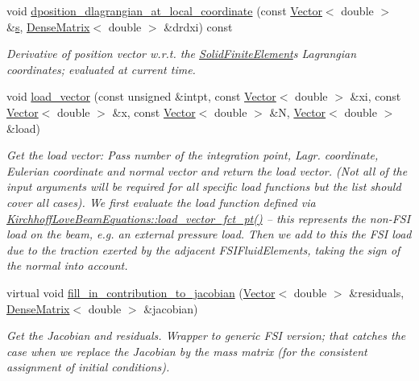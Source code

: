 \begin{DoxyCompactItemize}
void \hyperlink{classoomph_1_1FSIHermiteBeamElement_a29b2c933785e8b83eaed01608bf2463b}{dposition\+\_\+dlagrangian\+\_\+at\+\_\+local\+\_\+coordinate} (const \hyperlink{classoomph_1_1Vector}{Vector}$<$ double $>$ \&\hyperlink{cfortran_8h_ab7123126e4885ef647dd9c6e3807a21c}{s}, \hyperlink{classoomph_1_1DenseMatrix}{Dense\+Matrix}$<$ double $>$ \&drdxi) const
\begin{DoxyCompactList}\small\item\em Derivative of position vector w.\+r.\+t. the \hyperlink{classoomph_1_1SolidFiniteElement}{Solid\+Finite\+Element}\textquotesingle{}s Lagrangian coordinates; evaluated at current time. \end{DoxyCompactList}\item 
void \hyperlink{classoomph_1_1FSIHermiteBeamElement_aee4b8fcdef1a2247389bab8807d5db8e}{load\+\_\+vector} (const unsigned \&intpt, const \hyperlink{classoomph_1_1Vector}{Vector}$<$ double $>$ \&xi, const \hyperlink{classoomph_1_1Vector}{Vector}$<$ double $>$ \&x, const \hyperlink{classoomph_1_1Vector}{Vector}$<$ double $>$ \&N, \hyperlink{classoomph_1_1Vector}{Vector}$<$ double $>$ \&load)
\begin{DoxyCompactList}\small\item\em Get the load vector\+: Pass number of the integration point, Lagr. coordinate, Eulerian coordinate and normal vector and return the load vector. (Not all of the input arguments will be required for all specific load functions but the list should cover all cases). We first evaluate the load function defined via \hyperlink{classoomph_1_1KirchhoffLoveBeamEquations_a0710dd43c856aaa9c94d3112f8cba7ed}{Kirchhoff\+Love\+Beam\+Equations\+::load\+\_\+vector\+\_\+fct\+\_\+pt()} -- this represents the non-\/\+F\+SI load on the beam, e.\+g. an external pressure load. Then we add to this the F\+SI load due to the traction exerted by the adjacent F\+S\+I\+Fluid\+Elements, taking the sign of the normal into account. \end{DoxyCompactList}\item 
virtual void \hyperlink{classoomph_1_1FSIHermiteBeamElement_ab81052ae3c54d8387f0d8cd485cf156f}{fill\+\_\+in\+\_\+contribution\+\_\+to\+\_\+jacobian} (\hyperlink{classoomph_1_1Vector}{Vector}$<$ double $>$ \&residuals, \hyperlink{classoomph_1_1DenseMatrix}{Dense\+Matrix}$<$ double $>$ \&jacobian)
\begin{DoxyCompactList}\small\item\em Get the Jacobian and residuals. Wrapper to generic F\+SI version; that catches the case when we replace the Jacobian by the mass matrix (for the consistent assignment of initial conditions). \end{DoxyCompactList}\item 

\end{DoxyCompactItemize}
